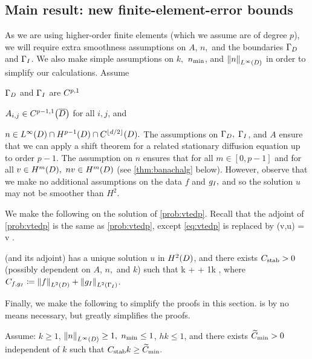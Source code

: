 \subsection{Main result: new finite-element-error bounds}\label{sec:errbounds}
As we are using higher-order finite elements (which we assume are of degree $p$), we will require extra smoothness assumptions on $A$, $n,$ and the boundaries $\Gamma_{D}$ and $\Gamma_{I}$. We also make simple assumptions on $k,$ $n_{\min}$, and $\NLiD{n}$ in order to simplify our calculations.
\label{ass:highp}
Assume
\bit
\item $\Gamma_{D}$ and $\Gamma_{I}$ are $C^{p,1}$
\item $\Aij \in \CpmooDclos$ for all $i,j$, and
\item $n \in \LiD \cap \HpmoD \cap \CfloordtD.$
  \eit
  \eas
  The assumptions on $\Gamma_{D},$ $\Gamma_{I}$, and $A$ ensure that we can apply a shift theorem for a related stationary diffusion equation up to order $p-1$. The assumption on $n$ ensures that for all $m \in [0,p-1]$ and for all $v \in \HmD,$ $nv \in \HmD$ (see \cref{thm:banachalg} below). However, observe that we make no additional assumptions on the data $f$ and $g_{I},$ and so the solution $u$ may not be smoother than $H^2.$

We make the following  on the solution of \cref{prob:vtedp}. Recall that the adjoint of \cref{prob:vtedp} is the same as \cref{prob:vtedp}, except \cref{eq:vtedp} is replaced by
\beq\label{eq:adjoint}
\aT(v,u) =  \tforall v \in \HozDDR.
\eeq

\bas\label{ass:htwo}
 (and its adjoint) has a unique solution $u$ in $\HtD$, and there exists $C_{\mathrm{stab}}>0$ (possibly dependent on $A$, $n,$ and $k$) such that
\beq\label{eq:generalhtwo}
k  +  + \frac1k  \leq \CAnk \Cfg,
\eeq
where $\Cfg \de \NLtD{f} + \NLtGI{\gI}$.
\eas

Finally, we make the following  to simplify the proofs in this section.  is by no means necessary, but greatly simplifies the proofs.

\label{ass:convenient}
Assume: $k \geq 1$, $\NLiD{n} \geq 1,$ $n_{\min} \leq 1$, $hk \leq 1$, and there exists $\widetilde{C}_{\min} > 0$ independent of $k$ such that $C_{\mathrm{stab}} k \geq \widetilde{C}_{\min}.$
\eas

